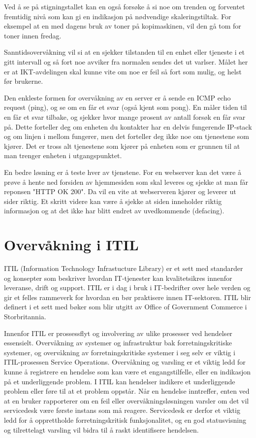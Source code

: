 Ved å se på stigningstallet kan en også forsøke å si noe om trenden og forventet fremtidig nivå som kan gi en indikasjon på nødvendige skaleringstiltak. For eksempel at en med dagens bruk av toner på kopimaskinen, vil den gå tom for toner innen fredag. 

Sanntidsovervåkning vil si at en sjekker tilstanden til en enhet eller tjeneste i et gitt intervall og så fort noe avviker fra normalen sendes det ut varlser. Målet her er at IKT-avdelingen skal kunne vite om noe er feil så fort som mulig, og helst før brukerne.

Den enkleste formen for overvåkning av en server er å sende en ICMP echo request (ping), og se om en får et svar (også kjent som pong). En måler tiden til en får et svar tilbake, og sjekker hvor mange prosent av antall forsøk en får svar på. Dette forteller deg om enheten du kontakter har en delvis fungerende IP-stack og om linjen i mellom fungerer, men det forteller deg ikke noe om tjenestene som kjører. Det er tross alt tjenestene som kjører på enheten som er grunnen til at man trenger enheten i utgangspunktet.

En bedre løsning er å teste hver av tjenstene. For en webserver kan det være å prøve å hente ned forsiden av hjemmesiden som skal leveres og sjekke at man får reponsen "HTTP OK 200". Da vil en vite at webserveren kjører og leverer ut sider riktig. Et skritt videre kan være å sjekke at siden inneholder riktig informasjon og at det ikke har blitt endret av uvedkommende (defacing).

\section{Overvåkning i ITIL}
ITIL (Information Technology Infrastucture Library) er et sett med standarder og konsepter som beskriver hvordan IT-tjenester kan kvalitetsikres innenfor leveranse, drift og support. ITIL er i dag i bruk i IT-bedrifter over hele verden og gir et felles rammeverk for hvordan en bør praktisere innen IT-sektoren. ITIL blir definert i et sett med bøker som blir utgitt av Office of Government Commerce i Storbritannia.

Innenfor ITIL er prossessflyt og involvering av ulike prosesser ved hendelser essensielt.  Overvåkning av systemer og infrastruktur bak forretningskritiske systemer, og overvåkning av forretningskritiske systemer i seg selv er viktig i ITIL-prosessen Service Operations. Overvåkning og varsling er et viktig ledd for kunne å registrere en hendelse som kan være et engangstilfelle, eller en indikasjon på et underliggende problem. 
I ITIL kan hendelser indikere et underliggende problem eller føre til at et problem oppstår. Når en hendelse inntreffer, enten ved at en bruker rapporterer om en feil eller overvåkningsløsningen varsler om det vil servicedesk være første instans som må reagere. Servicedesk er derfor et viktig ledd for å opprettholde forretningskritisk funksjonalitet, og en god statusvisning og tilrettelagt varsling vil bidra til å raskt identifisere hendelsen.


